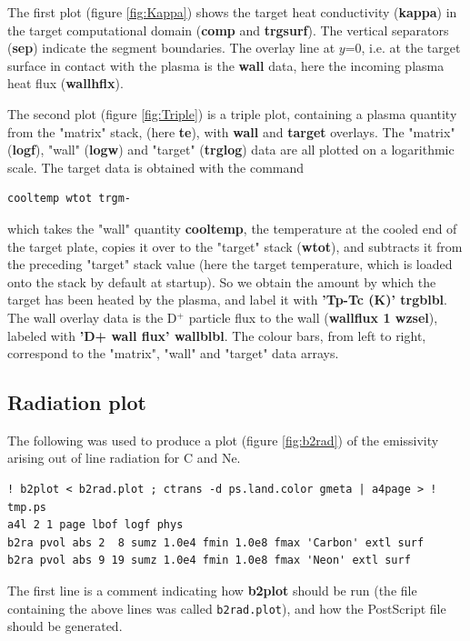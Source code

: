 \documentclass[a4paper,10pt]{report}
\newcommand{\btwoplot}{{\bf b2plot} }
\begin{document}
The first plot (figure \ref{fig:Kappa}) shows the target heat conductivity ({\bf kappa}) in the target
computational domain ({\bf comp} and {\bf trgsurf}).
The vertical separators ({\bf sep}) indicate the segment boundaries.
The overlay line at $y$=0, i.e. at the target surface in contact with the plasma is the {\bf wall} data,
here the incoming plasma heat flux ({\bf wallhflx}).

The second plot (figure \ref{fig:Triple}) is a triple plot, containing
a plasma quantity from the "matrix" stack, (here {\bf te}), with {\bf wall} and {\bf target} overlays.
The "matrix" ({\bf logf}), "wall" ({\bf logw}) and "target" ({\bf trglog}) data are all plotted on
a logarithmic scale. The target data is obtained with the command
\begin{verbatim}
cooltemp wtot trgm-
\end{verbatim}
which takes the "wall" quantity {\bf cooltemp}, the temperature at the cooled end of the target plate, copies it
over to the "target" stack ({\bf wtot}), and subtracts it from the preceding "target" stack value (here the
target temperature, which is loaded onto the stack by default at startup). So we obtain the amount by which
the target has been heated by the plasma, and label it with {\bf 'Tp-Tc (K)' trgblbl}.
The wall overlay data is the D$^+$ particle flux to the wall ({\bf wallflux 1 wzsel}), labeled with
{\bf 'D+ wall flux' wallblbl}. The colour bars, from left to right, correspond to the "matrix", "wall"
and "target" data arrays.

\subsection{Radiation plot}

The following was used to produce a plot (figure \ref{fig:b2rad}) of
the emissivity arising out of line radiation for C and Ne.

\begin{verbatim}
! b2plot < b2rad.plot ; ctrans -d ps.land.color gmeta | a4page > ! tmp.ps
a4l 2 1 page lbof logf phys
b2ra pvol abs 2  8 sumz 1.0e4 fmin 1.0e8 fmax 'Carbon' extl surf
b2ra pvol abs 9 19 sumz 1.0e4 fmin 1.0e8 fmax 'Neon' extl surf
\end{verbatim}

The first line is a comment indicating how \btwoplot should be run (the
file containing the above lines was called {\tt b2rad.plot}), and how
the PostScript file should be generated.
\end{document}
